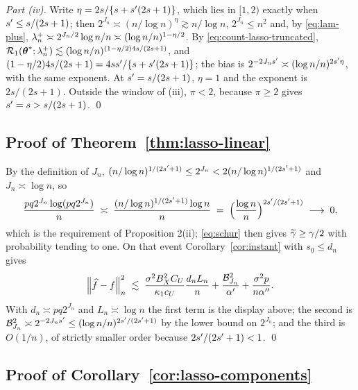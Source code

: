\emph{Part (iv).} Write $\eta = 2s/\{s+s'(2s+1)\}$, which lies in $[1,2)$
exactly when $s' \le s/(2s+1)$; then $2^{J_n} \asymp (n/\log n)^{\eta}
\gtrsim n/\log n$, $2^{J_n} \le n^{2}$ and, by \eqref{eq:lam-plus},
$\lambda_{n}^{+} \asymp 2^{J_n/2}\log n/n \asymp (\log n/n)^{1-\eta/2}$. By
\eqref{eq:count-lasso-truncated}, $\mathcal{R}_{1}(\boldsymbol{\theta}^{*};\lambda_{n}^{+}) \lesssim
(\log n/n)^{(1-\eta/2)4s/(2s+1)}$, and $(1-\eta/2)4s/(2s+1) =
4ss'/\{s+s'(2s+1)\}$; the bias is $2^{-2J_ns'} \asymp
(\log n/n)^{2s'\eta}$, with the same exponent. At $s' = s/(2s+1)$,
$\eta = 1$ and the exponent is $2s/(2s+1)$. Outside the window of (iii),
$\pi < 2$, because $\pi \ge 2$ gives $s' = s > s/(2s+1)$. \qed

\subsection*{Proof of Theorem~\ref{thm:lasso-linear}}

By the definition of $J_n$,
$(n/\log n)^{1/(2s'+1)} \le 2^{J_n} < 2(n/\log n)^{1/(2s'+1)}$ and
$J_n \asymp \log n$, so
\[
  \frac{pq2^{J_n}\log(pq2^{J_n})}{n}
  \;\asymp\; \frac{(n/\log n)^{1/(2s'+1)}\log n}{n}
  \;=\; \Bigl(\frac{\log n}{n}\Bigr)^{2s'/(2s'+1)}
  \;\longrightarrow\; 0,
\]
which is the requirement of Proposition 2(ii); \eqref{eq:schur} then gives
$\widetilde{\gamma} \ge \gamma/2$ with probability tending to one. On that event
Corollary~\ref{cor:instant} with $s_0 \le d_n$ gives
\[
  \left\lVert \widehat{f}-f \right\rVert_{n}^2 \;\lesssim\;
  \frac{\sigma^2B_X^2C_U}{\kappa_1c_U}\frac{d_nL_n}{n}
  + \frac{\mathcal{B}^2_{J_n}}{\alpha'} + \frac{\sigma^2p}{n\alpha''} .
\]
With $d_n \asymp pq2^{J_n}$ and $L_n \asymp \log n$ the first term is the
display above; the second is
$\mathcal{B}^2_{J_n} \asymp 2^{-2J_ns'} \le
(\log n/n)^{2s'/(2s'+1)}$ by the lower bound on $2^{J_n}$; and the third
is $O(1/n)$, of strictly smaller order because $2s'/(2s'+1)<1$. \qed

\subsection*{Proof of Corollary~\ref{cor:lasso-components}}

